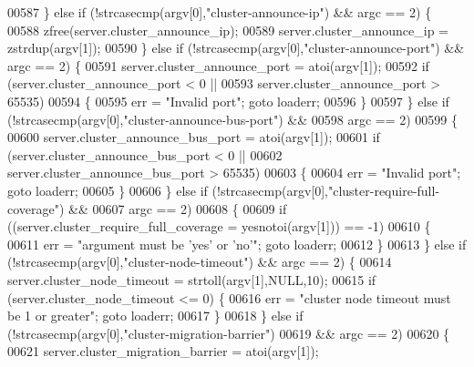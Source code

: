 \begin{DoxyCode}
{{00587         \} \textcolor{keywordflow}{else} \textcolor{keywordflow}{if} (!strcasecmp(argv[0],\textcolor{stringliteral}{"cluster-announce-ip"}) && argc == 2) \{
00588             zfree(server.cluster\_announce\_ip);
00589             server.cluster\_announce\_ip = zstrdup(argv[1]);
00590         \} \textcolor{keywordflow}{else} \textcolor{keywordflow}{if} (!strcasecmp(argv[0],\textcolor{stringliteral}{"cluster-announce-port"}) && argc == 2) \{
00591             server.cluster\_announce\_port = atoi(argv[1]);
00592             \textcolor{keywordflow}{if} (server.cluster\_announce\_port < 0 ||
00593                 server.cluster\_announce\_port > 65535)
00594             \{
00595                 err = \textcolor{stringliteral}{"Invalid port"}; \textcolor{keywordflow}{goto} loaderr;
00596             \}
00597         \} \textcolor{keywordflow}{else} \textcolor{keywordflow}{if} (!strcasecmp(argv[0],\textcolor{stringliteral}{"cluster-announce-bus-port"}) &&
00598                    argc == 2)
00599         \{
00600             server.cluster\_announce\_bus\_port = atoi(argv[1]);
00601             \textcolor{keywordflow}{if} (server.cluster\_announce\_bus\_port < 0 ||
00602                 server.cluster\_announce\_bus\_port > 65535)
00603             \{
00604                 err = \textcolor{stringliteral}{"Invalid port"}; \textcolor{keywordflow}{goto} loaderr;
00605             \}
00606         \} \textcolor{keywordflow}{else} \textcolor{keywordflow}{if} (!strcasecmp(argv[0],\textcolor{stringliteral}{"cluster-require-full-coverage"}) &&
00607                     argc == 2)
00608         \{
00609             \textcolor{keywordflow}{if} ((server.cluster\_require\_full\_coverage = yesnotoi(argv[1])) == -1)
00610             \{
00611                 err = \textcolor{stringliteral}{"argument must be 'yes' or 'no'"}; \textcolor{keywordflow}{goto} loaderr;
00612             \}
00613         \} \textcolor{keywordflow}{else} \textcolor{keywordflow}{if} (!strcasecmp(argv[0],\textcolor{stringliteral}{"cluster-node-timeout"}) && argc == 2) \{
00614             server.cluster\_node\_timeout = strtoll(argv[1],NULL,10);
00615             \textcolor{keywordflow}{if} (server.cluster\_node\_timeout <= 0) \{
00616                 err = \textcolor{stringliteral}{"cluster node timeout must be 1 or greater"}; \textcolor{keywordflow}{goto} loaderr;
00617             \}
00618         \} \textcolor{keywordflow}{else} \textcolor{keywordflow}{if} (!strcasecmp(argv[0],\textcolor{stringliteral}{"cluster-migration-barrier"})
00619                    && argc == 2)
00620         \{
00621             server.cluster\_migration\_barrier = atoi(argv[1]);
}}
\end{DoxyCode}

